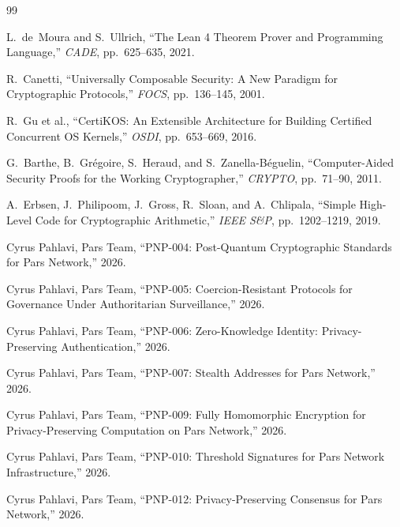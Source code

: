 \documentclass[11pt,a4paper]{article}
\begin{document}
\begin{thebibliography}{99}

L.~de~Moura and S.~Ullrich,
``The Lean 4 Theorem Prover and Programming Language,''
\emph{CADE}, pp.~625--635, 2021.

R.~Canetti,
``Universally Composable Security: A New Paradigm for Cryptographic
Protocols,''
\emph{FOCS}, pp.~136--145, 2001.

R.~Gu et al.,
``CertiKOS: An Extensible Architecture for Building Certified Concurrent
OS Kernels,''
\emph{OSDI}, pp.~653--669, 2016.

G.~Barthe, B.~Gr\'{e}goire, S.~Heraud, and S.~Zanella-B\'{e}guelin,
``Computer-Aided Security Proofs for the Working Cryptographer,''
\emph{CRYPTO}, pp.~71--90, 2011.

A.~Erbsen, J.~Philipoom, J.~Gross, R.~Sloan, and A.~Chlipala,
``Simple High-Level Code for Cryptographic Arithmetic,''
\emph{IEEE S\&P}, pp.~1202--1219, 2019.

Cyrus Pahlavi, Pars Team,
``PNP-004: Post-Quantum Cryptographic Standards for Pars Network,''
2026.

Cyrus Pahlavi, Pars Team,
``PNP-005: Coercion-Resistant Protocols for Governance Under
Authoritarian Surveillance,''
2026.

Cyrus Pahlavi, Pars Team,
``PNP-006: Zero-Knowledge Identity: Privacy-Preserving Authentication,''
2026.

Cyrus Pahlavi, Pars Team,
``PNP-007: Stealth Addresses for Pars Network,''
2026.

Cyrus Pahlavi, Pars Team,
``PNP-009: Fully Homomorphic Encryption for Privacy-Preserving
Computation on Pars Network,''
2026.

Cyrus Pahlavi, Pars Team,
``PNP-010: Threshold Signatures for Pars Network Infrastructure,''
2026.

Cyrus Pahlavi, Pars Team,
``PNP-012: Privacy-Preserving Consensus for Pars Network,''
2026.

\end{thebibliography}
\end{document}
